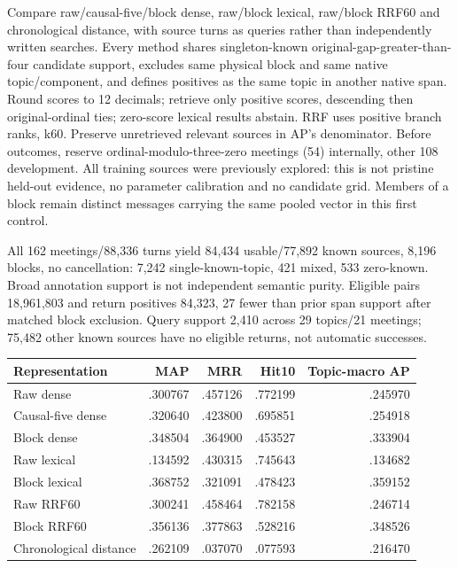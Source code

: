 \documentclass[11pt]{article}
\begin{document}
Compare raw/causal-five/block dense, raw/block lexical, raw/block RRF60\cite{rrf2009}
and chronological distance, with source turns as queries rather than independently
written searches. Every method shares singleton-known original-gap-greater-than-four
candidate support, excludes same physical block and same native topic/component,
and defines positives as the same topic in another native span. Round scores to
12 decimals; retrieve only positive scores, descending then original-ordinal ties;
zero-score lexical results abstain. RRF uses positive branch ranks, k60. Preserve
unretrieved relevant sources in AP's denominator. Before outcomes, reserve
ordinal-modulo-three-zero meetings (54) internally, other 108 development. All
training sources were previously explored: this is not pristine held-out evidence,
no parameter calibration and no candidate grid. Members of a block remain distinct
messages carrying the same pooled vector in this first control.

All 162 meetings/88,336 turns yield 84,434 usable/77,892 known sources, 8,196
blocks, no cancellation: 7,242 single-known-topic, 421 mixed, 533 zero-known.
Broad annotation support is not independent semantic purity. Eligible pairs
18,961,803 and return positives 84,323, 27 fewer than prior span support after
matched block exclusion. Query support 2,410 across 29 topics/21 meetings;
75,482 other known sources have no eligible returns, not automatic successes.

\begin{center}\small
\begin{tabular}{lrrrr}
Representation & MAP & MRR & Hit10 & Topic-macro AP \\\hline
Raw dense & .300767 & .457126 & .772199 & .245970 \\
Causal-five dense & .320640 & .423800 & .695851 & .254918 \\
Block dense & .348504 & .364900 & .453527 & .333904 \\
Raw lexical & .134592 & .430315 & .745643 & .134682 \\
Block lexical & .368752 & .321091 & .478423 & .359152 \\
Raw RRF60 & .300241 & .458464 & .782158 & .246714 \\
Block RRF60 & .356136 & .377863 & .528216 & .348526 \\
Chronological distance & .262109 & .037070 & .077593 & .216470
\end{tabular}\end{center}
\end{document}

